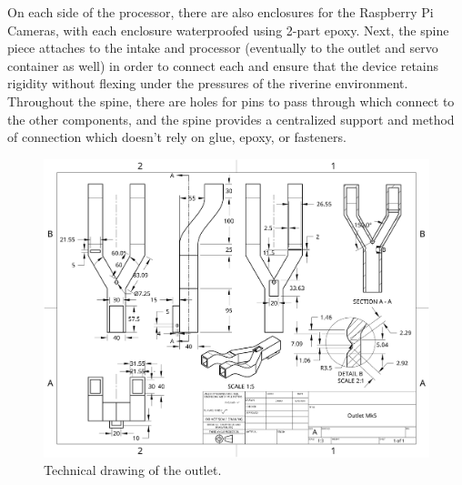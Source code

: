 \documentclass[fleqn,10pt]{SelfArx} %
\begin{document}
			On each side of the processor, there are also enclosures for the Raspberry Pi Cameras, with each enclosure waterproofed using 2-part epoxy. 
			\linebreak
			Next, the spine piece attaches to the intake and processor (eventually to the outlet and servo container as well) in order to connect each and ensure that the device retains rigidity without flexing under the pressures of the riverine environment. Throughout the spine, there are holes for pins to pass through which connect to the other components, and the spine provides a centralized support and method of connection which doesn’t rely on glue, epoxy, or fasteners. 
			\begin{figure}[h]
				\centering
				\includegraphics[width=1\linewidth]{Figures/TechOutlet}
				\caption[Outlet Tech. Drawing]{Technical drawing of the outlet.}
				\label{fig:techOutlet}
			\end{figure}
\end{document}
